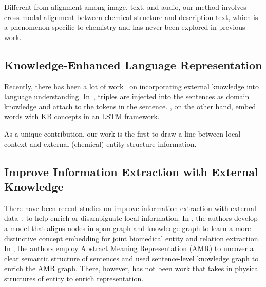Different from alignment among image, text, and audio, our method involves cross-modal alignment between chemical structure and description text, which is a phenomenon specific to chemistry and has never been explored in previous work.

\subsection{Knowledge-Enhanced Language Representation}

Recently, there has been a lot of work~\cite{knowbert, ernie, erica, kg4ner, kbert,kblstm,kadapter,kepler,kplug} on incorporating external knowledge into language understanding. In~\cite{kbert}, triples are injected into the sentences as domain knowledge and attach to the tokens in the sentence. \cite{kbert}, on the other hand, embed words with KB concepts in an LSTM framework. 

As a unique contribution, our work is the first to draw a line between local context and external (chemical) entity structure information.

\subsection{Improve Information Extraction with External Knowledge}

There have been recent studies on improve information extraction with external data~\cite{fetel, re_knowattn, Lai2021b, Zhang2021, Zhang2021b, eetreelstm, ie_knowledge_1}, to help enrich or disambiguate local information. In \cite{Lai2021b}, the authors develop a model that aligns nodes in span graph and knowledge graph to learn a more distinctive concept embedding for joint biomedical entity and relation extraction. In \cite{Zhang2021b}, the authors employ Abstract Meaning Representation (AMR) to uncover a clear semantic structure of sentences and used sentence-level knowledge graph to enrich the AMR graph. There, however, has not been work that takes in physical structures of entity to enrich representation.



